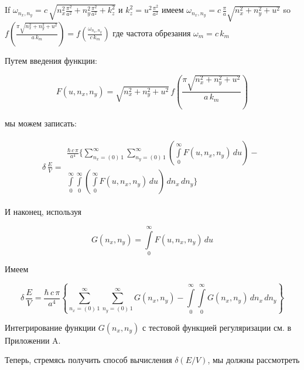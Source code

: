 \documentclass[11pt]{article}
\begin{document}
    If
\(\omega _{n_x,n_y} = c\,\sqrt{n_x^2\frac{\pi^2}{a^2}+n_y^2\frac{\pi^2}{a^2}+k_z^2}\)
и \(k_z^2 = u^2 \frac{\pi^2}{a^2}\) имеем
\(\omega _{n_x,n_y} = c \, \frac{\pi}{a} \sqrt{n_x^2+n_y^2+u^2}\) so
\(f\left(\frac{\pi\sqrt{n_x^2 + n_y^2+u^2}}{a\,k_m}\right) = f\left(\frac{\omega _{n_x,n_y}}{c\,k_m}\right)\)
где частота обрезания \(\omega_m = c\,k_m\)

    Путем введения функции:

    \begin{equation}
F\left(u, n_x, n_y\right) = 
\sqrt{n_x^2 + n_y^2+u^2}\,
f\left(\frac{\pi\sqrt{n_x^2 + n_y^2+u^2}}{a\,k_m}\right)
\end{equation}

    мы можем записать:

    \begin{equation}
\begin{array}{lr}
\delta\,\frac{E}{V} =
\begin{array}{c}
\frac{\hbar\,c\,\pi}{a^4}
\Bigg\{
\sum\limits_{n_x=\left(0\right)\,1}^{\infty}
\sum\limits_{n_y=\left(0\right)\,1}^{\infty}
\left(\int\limits_{0}^{\infty}F\left(u, n_x, n_y\right)\,d{u}\right)
- \\
\int\limits_{0}^{\infty}
\int\limits_{0}^{\infty}
\left(\int\limits_{0}^{\infty}F\left(u, n_x, n_y\right)\,d{u}\right)
\,d{n_x}\,d{n_y}
\Bigg\}
\end{array}
\end{array}
\end{equation}

    И наконец, используя

    \begin{equation}
G\left(n_x, n_y\right) = \int\limits_{0}^{\infty}F\left(u, n_x, n_y\right)\,d{u}
\end{equation}

    Имеем

    \begin{equation}
\delta\,\frac{E}{V} = \frac{\hbar\,c\,\pi}{a^4}
\left\{
\sum\limits_{n_x=\left(0\right)\,1}^{\infty}
\sum\limits_{n_y=\left(0\right)\,1}^{\infty}
G\left(n_x, n_y\right)
-
\int\limits_{0}^{\infty}
\int\limits_{0}^{\infty}
G\left(n_x, n_y\right)
\,d{n_x}\,d{n_y}
\right\}
\end{equation}

Интегрирование функции \(G\left(n_x, n_y\right)\) с тестовой функцией
регуляризации см. в Приложении A.

    Теперь, стремясь получить способ вычисления \(\delta\left(E/V\right)\),
мы должны рассмотреть
\end{document}
